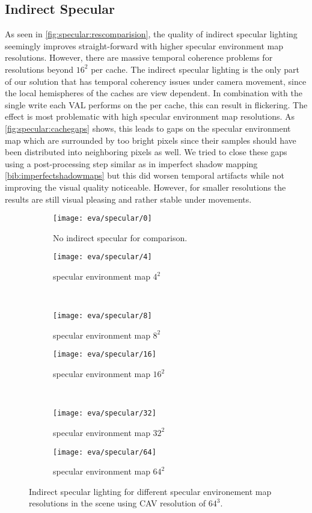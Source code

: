 \documentclass[thesis.tex]{subfiles}
\begin{document}
\subsection{Indirect Specular}
As seen in \autoref{fig:specular:rescomparision}, the quality of indirect specular lighting seemingly improves straight-forward with higher specular environment map resolutions.
However, there are massive temporal coherence problems for resolutions beyond $16^2$ per cache.
The indirect specular lighting is the only part of our solution that has temporal coherency issues under camera movement, since the local hemispheres of the caches are view dependent.
In combination with the single write each VAL performs on the per cache, this can result in flickering.
The effect is most problematic with high specular environment map resolutions.
As \autoref{fig:specular:cachegaps} shows, this leads to gaps on the specular environment map which are surrounded by too bright pixels since their samples should have been distributed into neighboring pixels as well.
We tried to close these gaps using a post-processing step similar as in imperfect shadow mapping \autoref{bib:imperfectshadowmaps} but this did worsen temporal artifacts while not improving the visual quality noticeable.
However, for smaller resolutions the results are still visual pleasing and rather stable under movements.
%
\begin{figure}
\begin{subfigure}[b]{\halfpageimage}
\texttt{[image: eva/specular/0]}
\caption{No indirect specular for comparison.}
\end{subfigure}
\begin{subfigure}[b]{\halfpageimage}
\texttt{[image: eva/specular/4]}
\caption{specular environment map $4^2$}
\end{subfigure}
\\
\begin{subfigure}[b]{\halfpageimage}
\texttt{[image: eva/specular/8]}
\caption{specular environment map $8^2$}
\end{subfigure}
\begin{subfigure}[b]{\halfpageimage}
\texttt{[image: eva/specular/16]}
\caption{specular environment map $16^2$}
\end{subfigure}
\\
\begin{subfigure}[b]{\halfpageimage}
\texttt{[image: eva/specular/32]}
\caption{specular environment map $32^2$}
\end{subfigure}
\begin{subfigure}[b]{\halfpageimage}
\texttt{[image: eva/specular/64]}
\caption{specular environment map $64^2$}
\end{subfigure}
\caption{Indirect specular lighting for different specular environement map resolutions in the  scene using CAV resolution of $64^3$. }
\label{fig:specular:rescomparision}
\end{figure}
\end{document}
